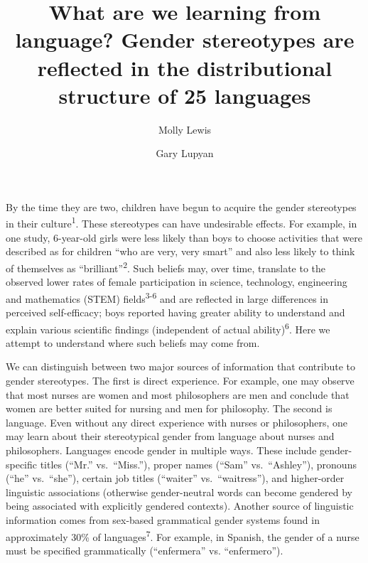 \documentclass[9pt,twocolumn]{pnas-new}
\title{What are we learning from language? Gender stereotypes are reflected in the distributional structure of 25 languages}
\author[a,*]{Molly Lewis}
\author[b]{Gary Lupyan}
\affil[a]{Carnegie Mellon University, Psychology Department/Social and Decision Sciences, Pittsburgh, PA, USA}
\affil[b]{University of Wisconsin-Madison, Psychology Department, Madison, WI, USA}
\begin{document}
\maketitle
\thispagestyle{firststyle}


\let\thefootnote\relax{}

By the time they are two, children  have begun to acquire the
gender stereotypes in their culture\textsuperscript{1}. These
stereotypes can have undesirable effects. For example, in one study,
6-year-old girls were less likely than boys to choose activities that
were described as for children \enquote{who are very, very smart} and
also less likely to think of themselves as \enquote{brilliant}\textsuperscript{2}. Such beliefs may, over time, translate to the observed lower rates of female participation in science, technology, engineering and mathematics (STEM) fields\textsuperscript{3-6} and are reflected in large differences in perceived self-efficacy; boys reported having greater ability to understand and explain various scientific findings  (independent of actual ability)\textsuperscript{6}.  Here we attempt to understand where such beliefs may come from.

We can distinguish between two major sources of information that contribute to gender stereotypes. The first is direct experience. For
example, one may observe that most nurses are women and most
philosophers are men and conclude that women are better suited for
nursing and men for philosophy. The second is language. Even without any
direct experience with nurses or philosophers, one may learn about their
stereotypical gender from language about nurses and philosophers.
Languages encode gender in multiple ways. These include gender-specific
titles (\enquote{Mr.} vs.\ \enquote{Miss.}), proper names (\enquote{Sam}
vs.\ \enquote{Ashley}), pronouns (\enquote{he} vs.\ \enquote{she}),
certain job titles (\enquote{waiter} vs.\ \enquote{waitress}), and
higher-order linguistic associations (otherwise gender-neutral words can
become gendered by being associated with explicitly gendered contexts).
Another source of linguistic information comes from sex-based
grammatical gender systems found in approximately 30\% of languages\textsuperscript{7}. For example, in Spanish, the gender of a
nurse must be specified grammatically (\enquote{enfermera} vs.
\enquote{enfermero}).
\end{document}
